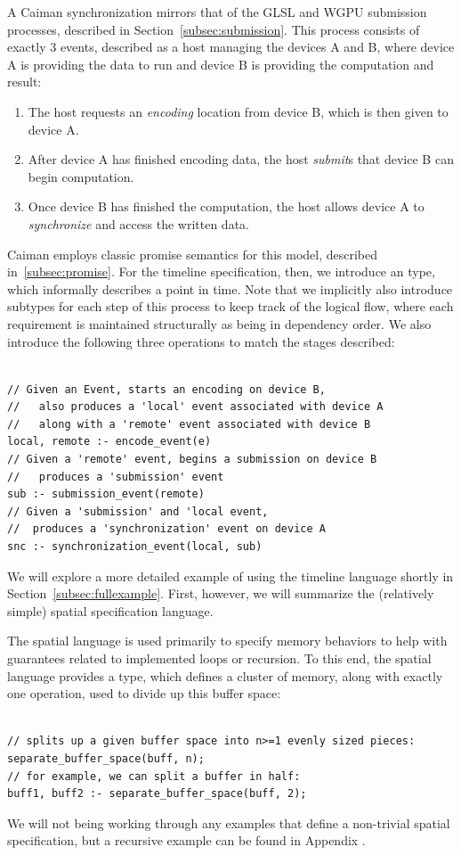 A Caiman synchronization mirrors that of the GLSL and WGPU submission processes, described in Section~\ref{subsec:submission}.  This process consists of exactly 3 events, described as a host managing the devices A and B, where device A is providing the data to run and device B is providing the computation and result:
%
\begin{enumerate}
\item The host requests an \emph{encoding} location from device B, which is then given to device A.
\item After device A has finished encoding data, the host \emph{submit}s that device B can begin computation.
\item Once device B has finished the computation, the host allows device A to \emph{synchronize} and access the written data.
\end{enumerate}
%
Caiman employs classic promise semantics for this model, described in~\ref{subsec:promise}.  For the timeline specification, then, we introduce an  type, which informally describes a point in time.  Note that we implicitly also introduce subtypes for each step of this process to keep track of the logical flow, where each requirement is maintained structurally as being in dependency order. We also introduce the following three operations to match the stages described:
%
\begin{lstlisting}

// Given an Event, starts an encoding on device B,
//   also produces a 'local' event associated with device A
//   along with a 'remote' event associated with device B
local, remote :- encode_event(e)
// Given a 'remote' event, begins a submission on device B
//   produces a 'submission' event
sub :- submission_event(remote)
// Given a 'submission' and 'local event, 
//  produces a 'synchronization' event on device A
snc :- synchronization_event(local, sub)
\end{lstlisting}
%
We will explore a more detailed example of using the timeline language shortly in Section~\ref{subsec:fullexample}.  First, however, we will summarize the (relatively simple) spatial specification language.

The spatial language is used primarily to specify memory behaviors to help with guarantees related to implemented loops or recursion.  To this end, the spatial language provides a  type, which defines a cluster of memory, along with exactly one operation, used to divide up this buffer space:
%
\begin{lstlisting}

// splits up a given buffer space into n>=1 evenly sized pieces:
separate_buffer_space(buff, n);
// for example, we can split a buffer in half:
buff1, buff2 :- separate_buffer_space(buff, 2);
\end{lstlisting}
%
We will not being working through any examples that define a non-trivial spatial specification, but a recursive example can be found in Appendix .

